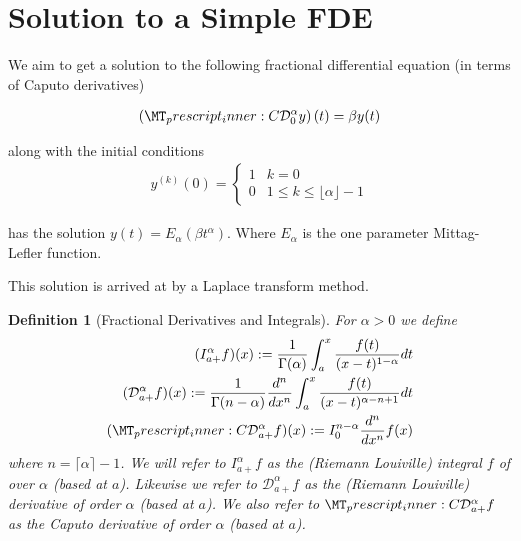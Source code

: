 \documentclass{article}
\begin{document}
\setlength\parindent{0pt}
\setlength{\parskip}{5mm plus4mm minus3mm}
\fancyfoot[r]{\today}
\newtheorem{theorem}{Theorem}
\newtheorem{lemma}{Lemma}
\newtheorem{definition}{Definition}
\newtheorem{corollary}{Corollary}
\newcommand{\laplace}[1]{ \mathcal{L} \left\{ #1 \right\} }
\newcommand{\rld}[3]{ \left( \mathcal{D}_{#1}^{#2} #3 \right) }
\newcommand{\rli}[3]{ \left( I_{#1}^{#2} #3 \right) }
\newcommand{\der}[3]{ \frac{d^{#3}#1}{d#2^{#3}} }
\newcommand{\capder}[3]{ \left( \prescript{C}{}{\mathcal{D}_{#1}^{#2}} #3 \right) }
\section*{Solution to a Simple FDE}

We aim to get a solution to the following fractional differential equation (in terms of Caputo derivatives)


\begin{align}
	\label{eq:fde-1}
	\left( \prescript{C}{}{\mathcal{D}_0^\alpha}y \right)(t) = \beta y(t) 
\end{align}

along with the initial conditions 
\begin{align}
	\label{eq:fde-1-ic}
	y^{(k)}(0) = 
	\begin{cases}
		1 & k = 0 \\
		0 & 1 \leq k \leq \lfloor \alpha \rfloor - 1  
	\end{cases}
\end{align}

has the solution $ y(t) = E_\alpha \left( \beta t^\alpha \right) $. Where $ E_\alpha $ is the one parameter Mittag-Lefler function.

This solution is arrived at by a Laplace transform method.

\begin{definition}[Fractional Derivatives and Integrals]
	For $ \alpha > 0 $ we define
	\begin{align*}
		(I_{a+}^{\alpha}f)(x) := \frac{1}{\Gamma(\alpha)}\int_a^x \frac{f(t)}{(x-t)^{1 - \alpha}} dt \\
		(\mathcal{D}_{a+}^{\alpha}f)(x) := \frac{1}{\Gamma(n-\alpha)} \frac{d^n}{dx^n}\int_a^x \frac{f(t)}{(x-t)^{\alpha - n + 1}} dt \\
		(\prescript{C}{}{\mathcal{D}}_{a+}^\alpha f)(x) := I_{0}^{n-\alpha} \frac{d^n}{dx^n}f(x) 
	\end{align*}
	where $ n  = \lceil \alpha \rceil - 1$.
	We will refer to $ I_{a+}^\alpha f$ as the (Riemann Louiville) integral $ f $ of over $ \alpha $ (based at $ a $).
	Likewise we refer to $ \mathcal{D}_{a+}^\alpha f $ as the (Riemann Louiville) derivative of order $ \alpha $ (based at $ a $).
	We also refer to $ \prescript{C}{}{\mathcal{D}}_{a+}^\alpha f $ as the Caputo derivative of order $ \alpha $ (based at $ a $).
	
\end{definition}
\end{document}
